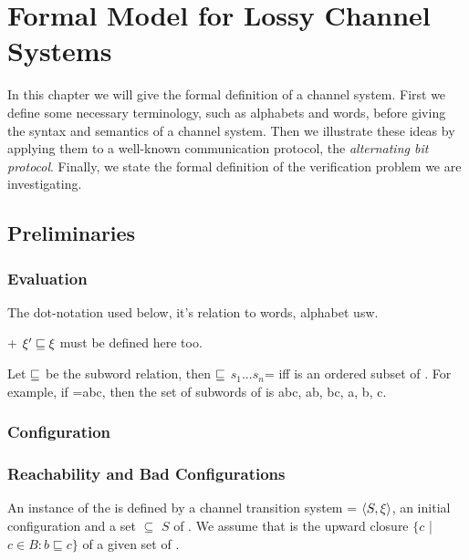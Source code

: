 \section{Formal Model for Lossy Channel Systems}
\label{definitions}
In this chapter we will give the formal definition of a channel system. First we define some necessary terminology, such as alphabets and words, before giving the syntax and semantics of a channel system. Then we illustrate these ideas by applying them to a well-known communication protocol, the \emph{alternating bit protocol}. Finally, we state the formal definition of the verification problem we are investigating.


\subsection{Preliminaries}
\subsubsection{Evaluation}
The dot-notation used below, it's relation to words, alphabet usw.

+ $\xi' \sqsubseteq \xi$ must be defined here too.


Let $\sqsubseteq$ be the subword relation, then  $\sqsubseteq$ $s_1...s_n$= iff  is an ordered subset of . For example, if =abc, then the set of subwords of  is {abc, ab, bc, a, b, c}.

\subsubsection{Configuration}

\subsubsection{Reachability and Bad Configurations}
\label{bad}
An instance of the  is defined by a channel transition system  = $\langle S,\xi\rangle$, an initial configuration  and a set  $\subseteq$ $S$ of . We assume that  is the upward closure $\{c$ | $ c \in B: b \sqsubseteq c\}$ of a given  set of .

